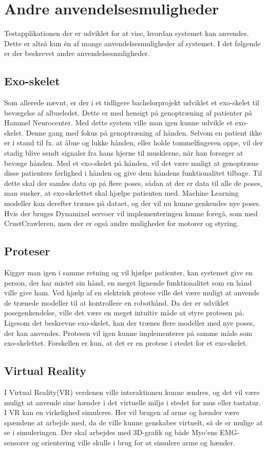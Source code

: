 \section{Andre anvendelsesmuligheder}
Testapplikationen der er udviklet for at vise, hvordan systemet kan anvendes. Dette er altså kun én af mange anvendelsesmuligheder af systemet. I det følgende er der beskrevet andre anvendelsesmuligheder.

\subsection{Exo-skelet}
Som allerede nævnt, er der i et tidligere bachelorprojekt\citep{RefWorks:7} udviklet et exo-skelet til bevægelse af albueledet. Dette er med hensigt på genoptræning af patienter på Hammel Neurocenter. Med dette system ville man igen kunne udvikle et exo-skelet. Denne gang med fokus på genoptræning af hånden. Selvom en patient ikke er i stand til fx. at  åbne og lukke hånden, eller holde tommelfingeren oppe, vil der stadig blive sendt signaler fra hans hjerne til musklerne, når han forsøger at bevæge hånden. Med et exo-skelet på hånden, vil det være muligt at genoptræne disse patienters førlighed i hånden og give dem håndens funktionalitet tilbage. Til dette skal der samles data op på flere poses, sådan at der er data til alle de poses, man ønsker, at exo-skelettet skal hjælpe patienten med. Machine Learning modeller kan derefter trænes på dataet, og der vil nu kunne genkendes nye poses. Hvis der bruges Dynamixel servoer vil implementeringen kunne foregå, som med CrustCrawleren, men der er også andre muligheder for motorer og styring.

\subsection{Proteser}
Kigger man igen i samme retning og vil hjælpe patienter, kan systemet give en person, der har mistet sin hånd, en meget lignende funktionalitet som en hånd ville give ham. Ved hjælp af en elektrisk protese ville det være muligt at anvende de trænede modeller til at kontrollere en robothånd. Da der er udviklet posegenkendelse, ville det være en meget intuitiv måde at styre protesen på. Ligesom det beskrevne exo-skelet, kan der trænes flere modeller med nye poses, der kan anvendes. Protesen vil igen kunne implementeres på samme måde som exo-skelettet. Forskellen er kun, at det er en protese i stedet for et exo-skelet.

\subsection{Virtual Reality}
I Virtual Reality(VR) verdenen ville interaktionen kunne ændres, og det vil være muligt at anvende sine hænder i det virtuelle miljø i stedet for mus eller tastatur. I VR kan en virkelighed simuleres. Her vil brugen af arme og hænder være spændene at arbejde med, da de ville kunne genskabes virtuelt, så de er mulige at se i simuleringen. Der skal arbejdes med 3D-grafik og både Myo'ens EMG-sensorer og orientering ville skulle i brug for at simulere arme og hænder.